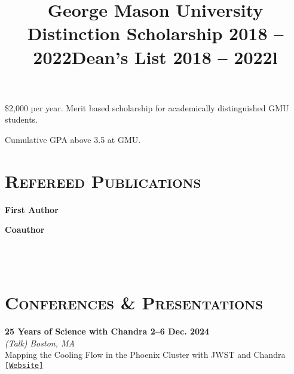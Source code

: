 \documentclass[marg, centered]{res}
\begin{document}
\begin{resume}
\vspace{-0.3cm}
\title{\textbf{George Mason University Distinction Scholarship} \hfill \textbf{2018 -- 2022}}
\begin{position}
\$2,000 per year. Merit based scholarship for academically distinguished GMU students.
\end{position}

\vspace{-0.3cm}
\title{\textbf{Dean's List} \hfill \textbf{2018 -- 2022}}
\begin{position}
Cumulative GPA above 3.5 at GMU.
\end{position}

\section{{\scshape \bfseries Refereed Publications}}

\vspace{-0.1cm}
\textbf{First Author}
\vspace{0.05cm}

\textbf{Coauthor}
\vspace{0.05cm}
\vspace{0.05cm}


\begin{format}
\title{l} \\
 \\
\body
\end{format}

\section{{\scshape \bfseries Conferences \& Presentations}}

\begin{etaremune}

\item \textbf{25 Years of Science with Chandra \hfill \textbf{2--6 Dec. 2024}}\\
\textit{(Talk)} \hfill \textit{Boston, MA}\\
Mapping the Cooling Flow in the Phoenix Cluster with JWST and Chandra
\href{https://cxc.cfa.harvard.edu/cdo/symposium_2024/schedule.html#talk}{\texttt{[Website]}}


\end{etaremune}
\end{resume}
\end{document}
